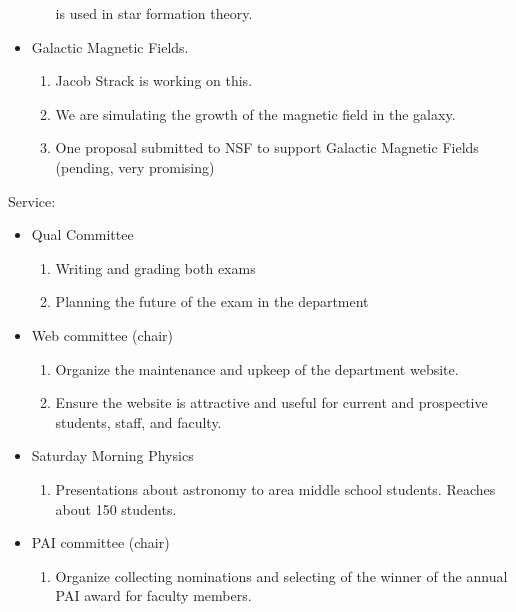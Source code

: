 \begin{itemize}
\begin{enumerate}
                is used in star formation theory.
        \end{enumerate}
    \item Galactic Magnetic Fields.  
        \begin{enumerate}
            \item Jacob Strack is working on this.
            \item We are simulating the growth of the magnetic field in the
                galaxy.  
            \item One proposal submitted to NSF to support Galactic Magnetic
                Fields (pending, very promising)
        \end{enumerate}
\end{itemize}
\vskip 30pt

\noindent
Service:
\begin{itemize}
	\item Qual Committee 
        \begin{enumerate}
            \item Writing and grading both exams
            \item Planning the future of the exam in the department
        \end{enumerate}
	\item Web committee (chair)
        \begin{enumerate}
            \item Organize the maintenance and upkeep of the department
                website.
            \item Ensure the website is attractive and useful for current
                and prospective students, staff, and faculty.
        \end{enumerate}
	\item Saturday Morning Physics
        \begin{enumerate}
            \item Presentations about astronomy to area middle school students.
                Reaches about 150 students.
        \end{enumerate}
    \item PAI committee (chair)
        \begin{enumerate}
            \item Organize collecting nominations and selecting of the winner of
                the annual PAI award for faculty members.
        \end{enumerate}
\end{itemize}	
\vskip 30pt



